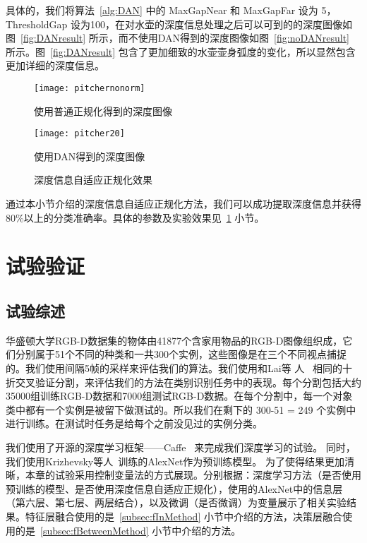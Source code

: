 具体的，我们将算法~\ref{alg:DAN} 中的 MaxGapNear 和 MaxGapFar 设为 5，ThresholdGap 设为100，在对水壶的深度信息处理之后可以可到的的深度图像如图~\ref{fig:DANresult} 所示，而不使用DAN得到的深度图像如图~\ref{fig:noDANresult} 所示。图~\ref{fig:DANresult} 包含了更加细致的水壶壶身弧度的变化，所以显然包含更加详细的深度信息。

\begin{figure}[htbp]
\begin{minipage}{0.48\textwidth}
  \centering
  \texttt{[image: pitchernonorm]}
  \caption{使用普通正规化得到的深度图像}
  \label{fig:noDANresult}
\end{minipage}\hfill
\begin{minipage}{0.48\textwidth}
  \centering
  \texttt{[image: pitcher20]}
  \caption{使用DAN得到的深度图像}
  \label{fig:DANresult}
\end{minipage}
\caption{深度信息自适应正规化效果}
\label{fig:DANcompare}
\end{figure}

通过本小节介绍的深度信息自适应正规化方法，我们可以成功提取深度信息并获得80\%以上的分类准确率。具体的参数及实验效果见~\ref{sec:deeplearningExp} 小节。

\section{试验验证}
\label{sec:deeplearningExp}

\subsection{试验综述}

华盛顿大学RGB-D数据集的物体由41877个含家用物品的RGB-D图像组织成，它们分别属于51个不同的种类和一共300个实例，这些图像是在三个不同视点捕捉的。我们使用间隔5帧的采样来评估我们的算法。我们使用和Lai等
人~ 相同的十折交叉验证分割，来评估我们的方法在类别识别任务中的表现。每个分割包括大约35000组训练RGB-D数据和7000组测试RGB-D数据。在每个分割中，每一个对象类中都有一个实例是被留下做测试的。所以我们在剩下的 300-51 = 249 个实例中进行训练。在测试时任务是给每个之前没见过的实例分类。

我们使用了开源的深度学习框架——Caffe~ 来完成我们深度学习的试验。
同时，我们使用Krizhevsky等人~训练的AlexNet作为预训练模型。
为了使得结果更加清晰，本章的试验采用控制变量法的方式展现。分别根据：深度学习方法（是否使用预训练的模型、是否使用深度信息自适应正规化），使用的AlexNet中的信息层（第六层、第七层、两层结合），以及微调（是否微调）为变量展示了相关实验结果。特征层融合使用的是~\ref{subsec:fInMethod} 小节中介绍的方法，决策层融合使用的是~\ref{subsec:fBetweenMethod} 小节中介绍的方法。


